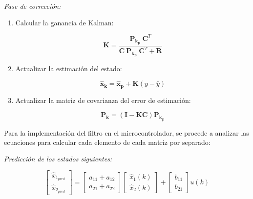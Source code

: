 \textit{Fase de corrección:}
\begin{enumerate}
    \item Calcular la ganancia de Kalman:
    
    \vspace{-0.5cm}
    \begin{equation}
        \mathbf{K} = \dfrac{\mathbf{P_{k_p}}\ \textbf{C}^T}{\textbf{C}\ \mathbf{P_{k_p}}\ \textbf{C}^T + \textbf{R}}
    \end{equation}
    \vspace{-0.5cm}

    \item Actualizar la estimación del estado:
    
    \vspace{-0.5cm}
    \begin{equation}
        \mathbf{\hat{x}_k} = \mathbf{\hat{x}_p} + \mathbf{K} (y - \hat{y})
    \end{equation}
    \vspace{-0.5cm}

    \item Actualizar la matriz de covarianza del error de estimación:
    
    \vspace{-0.5cm}
    \begin{equation}
        \mathbf{P_k} = (\textbf{I} - \mathbf{K} \mathbf{C}) \mathbf{P_{k_p}}
    \end{equation}
    \vspace{-0.5cm}
\end{enumerate}

Para la implementación del filtro en el microcontrolador, se procede a analizar las ecuaciones para calcular cada elemento
de cada matriz por separado:

\textit{Predicción de los estados siguientes:}

\vspace{-0.5cm}
\begin{equation}
    \begin{bmatrix}
        \hat{x}_{1_{pred}} \\
        \hat{x}_{2_{pred}} 
    \end{bmatrix}
    =
    \begin{bmatrix}
        a_{11} + a_{12} \\
        a_{21} + a_{22}
    \end{bmatrix}
    \begin{bmatrix}
        \hat{x}_{1}(k) \\
        \hat{x}_{2}(k)
    \end{bmatrix}
    +
    \begin{bmatrix}
        b_{11} \\
        b_{21}
    \end{bmatrix}
    u(k)
\end{equation}
\vspace{-0.5cm}

